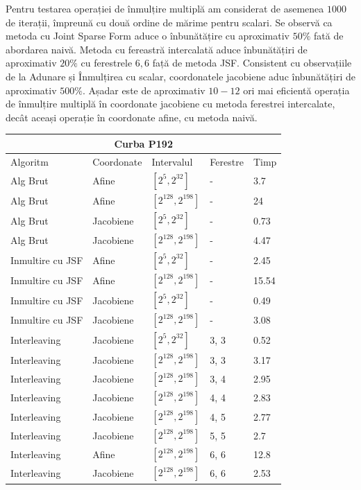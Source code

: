 Pentru testarea operației de înmulțire multiplă am considerat de asemenea $1000$ de iterații, împreună cu două ordine de mărime pentru scalari. Se observă ca metoda cu Joint Sparse Form aduce o înbunătățire cu aproximativ $50\%$ fată de abordarea naivă. Metoda cu fereastră intercalată aduce înbunătățiri de aproximativ $20\%$ cu ferestrele $6, 6$ față de metoda JSF. Consistent cu 
observațiile de la Adunare și Înmulțirea cu scalar, coordonatele jacobiene aduc înbunătățiri de aproximativ $500\%$. Așadar este de aproximativ $10-12$ ori mai eficientă operația de înmulțire multiplă în coordonate jacobiene cu metoda ferestrei intercalate, decât aceași operație în coordonate afine, cu metoda naivă.

\begin{tabular}{ |p{5cm}||p{3cm}|p{3cm}|p{2cm}|p{1cm}|  }
 \hline
 \multicolumn{5}{|c|}{Curba P192} \\
 \hline
  Algoritm& Coordonate &Intervalul &Ferestre &Timp\\
 \hline
 Alg Brut & Afine  &$[2^{5},2^{32}]$& - & 3.7\\
 Alg Brut & Afine  &$[2^{128},2^{198}]$& - & 24 \\
 Alg Brut & Jacobiene  &$[2^{5},2^{32}]$& - & 0.73 \\
 Alg Brut & Jacobiene  &$[2^{128},2^{198}]$& - & 4.47 \\
 Inmultire cu JSF & Afine  &$[2^{5},2^{32}]$& - & 2.45 \\
 Inmultire cu JSF & Afine  &$[2^{128},2^{198}]$& - & 15.54 \\
 Inmultire cu JSF & Jacobiene  &$[2^{5},2^{32}]$& - & 0.49 \\
 Inmultire cu JSF & Jacobiene  &$[2^{128},2^{198}]$& - & 3.08 \\
 Interleaving & Jacobiene  &$[2^{5},2^{32}]$& 3, 3 & 0.52 \\
 Interleaving & Jacobiene  &$[2^{128},2^{198}]$& 3, 3 & 3.17\\
 Interleaving & Jacobiene  &$[2^{128},2^{198}]$& 3, 4 &  2.95\\
 Interleaving & Jacobiene  &$[2^{128},2^{198}]$& 4, 4 & 2.83 \\
 Interleaving & Jacobiene  &$[2^{128},2^{198}]$& 4, 5 & 2.77 \\
 Interleaving & Jacobiene  &$[2^{128},2^{198}]$& 5, 5 & 2.7 \\
 Interleaving & Afine  &$[2^{128},2^{198}]$& 6, 6 & 12.8 \\
 Interleaving & Jacobiene  &$[2^{128},2^{198}]$& 6, 6 & 2.53 \\
 \hline
\end{tabular}

